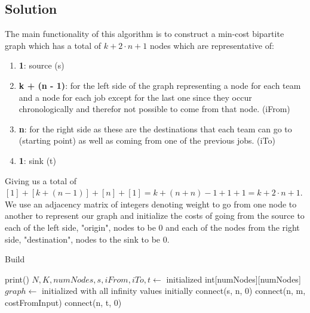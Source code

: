 \documentclass[12pt]{article}
\begin{document}

\subsection{Solution}
The main functionality of this algorithm is to construct a min-cost bipartite graph which has a total of
$k + 2\cdot n + 1$ nodes which are representative of:
\begin{enumerate}
    \item \textbf{1}: source (s)
    \item \textbf{k + (n - 1)}: for the left side of the graph representing a node for each team and a node for
        each job except for the last one since they occur chronologically and therefor not possible to come from
        that node. (iFrom)
    \item \textbf{n}: for the right side as these are the destinations that each team can go to (starting point)
        as well as coming from one of the previous jobs. (iTo)
    \item \textbf{1}: sink (t)
\end{enumerate}

Giving us a total of $[1] + [k + (n-1)] + [n] + [1] = k + (n + n) - 1 + 1 + 1 = k + 2\cdot n + 1$.
We use an adjacency matrix of integers denoting weight to go from one node to another to represent our graph
and initialize the costs of going from the source to each of the left side, "origin", nodes to be 0 and each of
the nodes from the right side, "destination", nodes to the sink to be 0.

\begin{algorithm}[H]
\caption{Build}
\begin{algorithmic}
            \State {}
            \State print()
        \EndFor
    \EndProcedure
        \State $N, K, numNodes, s, iFrom, iTo, t \gets$ initialized
        \State int[numNodes][numNodes] $graph \gets$ initialized with all infinity values initially
            \State connect(s, n, 0)
        \EndFor
                \State connect(n, m, costFromInput)
            \EndFor
        \EndFor
            \State connect(n, t, 0)
        \EndFor
    \EndProcedure
\end{algorithmic}
\end{algorithm}
\end{document}

